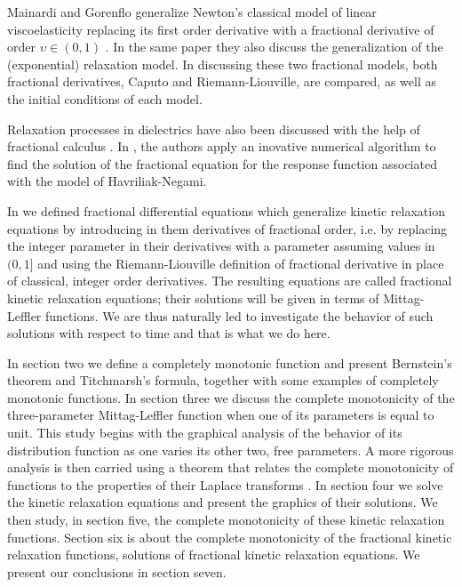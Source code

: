 \documentclass[12pt]{amsart}
\numberwithin{equation}{section}
\begin{document}
Mainardi and Gorenflo generalize Newton's classical model of linear
viscoelasticity replacing its first order derivative with a fractional
derivative of order $\upsilon \in (0,1)$ \cite{Mainardi:2007}. In the same
paper they also discuss the generalization of the (exponential) relaxation
model. In discussing these two fractional models, both fractional derivatives,
Caputo and Riemann-Liouville, are compared, as well as the initial conditions
of each model. 

Relaxation processes in dielectrics have also been discussed with the help of
fractional calculus \cite{Uchaikin:2003,Novikov:2005,Garrappa:2016}. In \cite{Baleanu:2011},
the authors apply an inovative numerical algorithm to find the solution of the
fractional equation for the response function associated with the model of
Havriliak-Negami.

In \cite{Ester:2015} we defined fractional differential equations which
generalize kinetic relaxation equations by introducing in them derivatives of
fractional order, i.e.  by replacing the integer parameter in their derivatives
with a parameter assuming values in $(0,1]$ and using the Riemann-Liouville
definition of fractional derivative in place of classical, integer order
derivatives. The resulting equations are called fractional kinetic relaxation
equations; their solutions will be given in terms of Mittag-Leffler functions.
We are thus naturally led to investigate the behavior of such solutions with
respect to time and that is what we do here. 

In section two we define a completely monotonic function and present
Bernstein's theorem and Titchmarsh's formula, together with some examples of
completely monotonic functions. In section three we discuss the complete
monotonicity of the three-parameter Mittag-Leffler function when one of its
parameters is equal to unit. This study begins with the graphical analysis of
the behavior of its distribution function as one varies its other two, free
parameters. A more rigorous analysis is then carried using a theorem that
relates the complete monotonicity of functions to the properties of their
Laplace transforms \cite{Gripenberg:1990}.  In section four we solve the
kinetic relaxation equations and present the graphics of their solutions.  We
then study, in section five, the complete monotonicity of these kinetic
relaxation functions.  Section six is about the complete monotonicity of the
fractional kinetic relaxation functions, solutions of fractional kinetic
relaxation equations. We present our conclusions in section seven.
\end{document}
